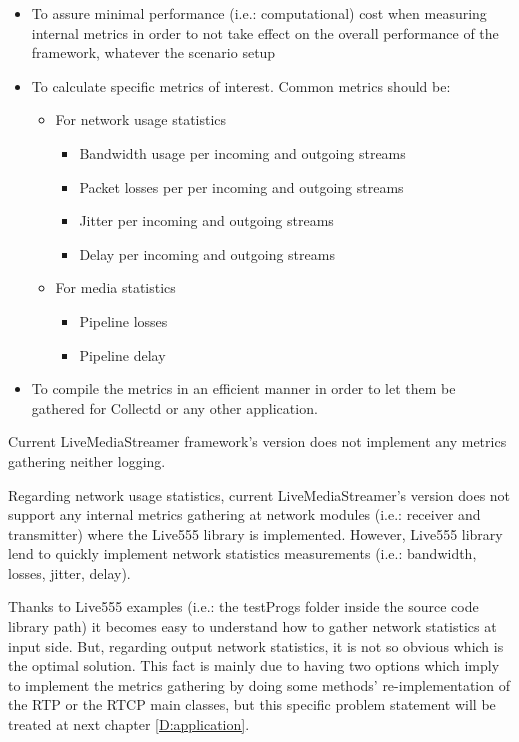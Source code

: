 \begin{itemize}
	\item To assure minimal performance (i.e.: computational) cost when measuring internal metrics in order to not take effect on the overall performance of the framework, whatever the scenario setup
	\item To calculate specific metrics of interest. Common metrics should be:
	\begin{itemize}
		\item For network usage statistics
		\begin{itemize}
			\item Bandwidth usage per incoming and outgoing streams
			\item Packet losses per per incoming and outgoing streams
			\item Jitter per incoming and outgoing streams
			\item Delay per incoming and outgoing streams
		\end{itemize}
		\item For media statistics
		\begin{itemize}
			\item Pipeline losses 
			\item Pipeline delay  
		\end{itemize}
	\end{itemize}
	\item To compile the metrics in an efficient manner in order to let them be gathered for Collectd or any other application.
\end{itemize}

Current LiveMediaStreamer framework's version does not implement any metrics gathering neither logging.

Regarding network usage statistics, current LiveMediaStreamer's version does not support any internal metrics gathering at network modules (i.e.: receiver and transmitter) where the Live555 library is implemented. However, Live555 library lend to quickly implement network statistics measurements (i.e.: bandwidth, losses, jitter, delay). 

Thanks to Live555 examples (i.e.: the testProgs folder inside the source code library path) it becomes easy to understand how to gather network statistics at input side. But, regarding output network statistics, it is not so obvious which is the optimal solution. This fact is mainly due to having two options which imply to implement the metrics gathering by doing some methods' re-implementation of the RTP or the RTCP main classes, but this specific problem statement will be treated at next chapter \ref{D:application}.

